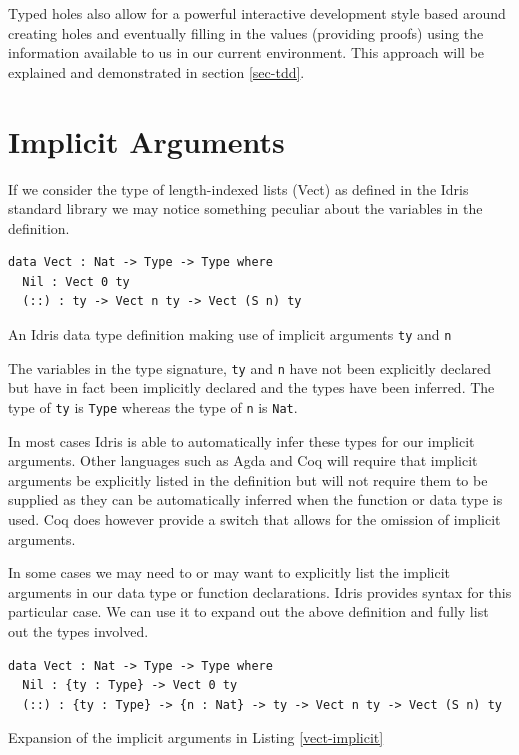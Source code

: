 \documentclass[a4paper, notitlepage]{report}
\begin{document}
Typed holes also allow for a powerful interactive development style based around
creating holes and eventually filling in the values (providing proofs) using the
information available to us in our current environment. This approach will be
explained and demonstrated in section \ref{sec-tdd}.

\section{Implicit Arguments}
\label{sec:org297626f}
If we consider the type of length-indexed lists (Vect) as defined in the Idris
standard library we may notice something peculiar about the variables in the
definition.

\begin{listing}[H]
\begin{verbatim}
data Vect : Nat -> Type -> Type where
  Nil : Vect 0 ty
  (::) : ty -> Vect n ty -> Vect (S n) ty
\end{verbatim}
\caption{An Idris data type definition making use of implicit arguments \texttt{ty} and \texttt{n} \label{vect-implicit}}
\end{listing}

The variables in the type signature, \texttt{ty} and \texttt{n} have not been explicitly declared
but have in fact been implicitly declared and the types have been inferred. The
type of \texttt{ty} is \texttt{Type} whereas the type of \texttt{n} is \texttt{Nat}.

In most cases Idris is able to automatically infer these types for our implicit
arguments. Other languages such as Agda and Coq will require that implicit
arguments be explicitly listed in the definition but will not require them to be
supplied as they can be automatically inferred when the function or data type is
used. Coq does however provide a switch that allows for the omission of implicit
arguments.

In some cases we may need to or may want to explicitly list the implicit
arguments in our data type or function declarations. Idris provides syntax for
this particular case. We can use it to expand out the above definition and fully
list out the types involved.

\begin{listing}[H]
\begin{verbatim}
data Vect : Nat -> Type -> Type where
  Nil : {ty : Type} -> Vect 0 ty
  (::) : {ty : Type} -> {n : Nat} -> ty -> Vect n ty -> Vect (S n) ty
\end{verbatim}
\caption{Expansion of the implicit arguments in Listing \ref{vect-implicit}}
\end{listing}
\end{document}
